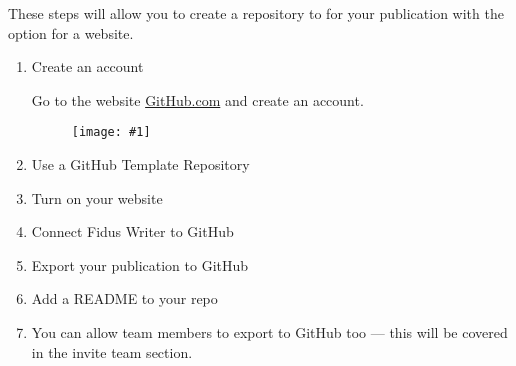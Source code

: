 \documentclass{article}
\newlength{\imgwidth}
\newcommand\scaledgraphics[2]{%
                
\settowidth{\imgwidth}{\texttt{[image: \#1]}}%
                
\setlength{\imgwidth}{\minof{\imgwidth}{#2\textwidth}}%
                
\texttt{[image: \#1]}%
                
}
\begin{document}
These steps will allow you to create a repository to for your publication with the option for a website.

\begin{enumerate}
\item Create an account


Go to the website \href{https://github.com/}{GitHub.com} and create an account.

\begin{figure}
\scaledgraphics{56369a22-3b5a-4691-aa78-51a8bd4bba37.png}{1}
\label{F22252491}
\end{figure}


\item Use a GitHub Template Repository





\item Turn on your website


\item Connect Fidus Writer to GitHub


\item Export your publication to GitHub


\item Add a README to your repo


\item You can allow team members to export to GitHub too — this will be covered in the invite team section.


\end{enumerate}




\printbibliography[title={Bibliography}]
\end{document}
